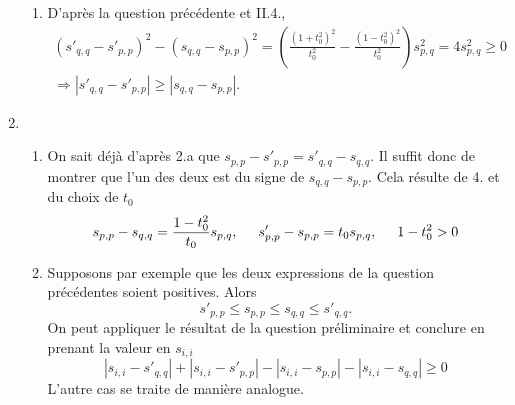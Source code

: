 \begin{enumerate}
\begin{enumerate}
 \item  D'après la question précédente et II.4.,
\begin{multline*}
 (s'_{q,q}-s'_{p,p})^2 - (s_{q,q}-s_{p,p})^2 
= \left( \frac{(1+t_0^2)^2}{t_0^2} - \frac{(1-t_0^2)^2}{t_0^2}\right)s_{p,q}^2 
= 4 s_{p,q}^2 \geq 0\\
\Rightarrow 
\left| s'_{q,q}-s'_{p,p} \right| \geq \left| s_{q,q}-s_{p,p} \right|.
\end{multline*}
\end{enumerate}

 \item
\begin{enumerate}
  \item On sait déjà d'après 2.a que $s_{p,p} - s'_{p,p} = s'_{q,q} - s_{q,q}$. Il suffit donc de montrer que l'un des deux est du signe de $s_{q,q} - s_{p,p}$.\newline
Cela résulte de 4. et du choix de $t_0$
\begin{displaymath}
 s_{p,p} - s_{q,q} = \frac{1-t_0^2}{t_0}s_{p,q},\hspace{0.5cm}
 s'_{p,p} - s_{p,p} = t_0 s_{p,q},\hspace{0.5cm}
 1-t_0^2 > 0
\end{displaymath}
 
 \item Supposons par exemple que les deux expressions de la question précédentes soient positives. Alors
\begin{displaymath}
 s'_{p,p} \leq s_{p,p} \leq s_{q,q} \leq s'_{q,q}.
\end{displaymath}
On peut appliquer le résultat de la question préliminaire et conclure en prenant la valeur en $s_{i,i}$
\begin{displaymath}
 |s_{i,i} - s'_{q,q}| + |s_{i,i} - s'_{p,p}| - |s_{i,i} - s_{p,p}| - |s_{i,i} - s_{q,q}|\geq 0
\end{displaymath}
L'autre cas se traite de manière analogue.
\end{enumerate}


\end{enumerate}

